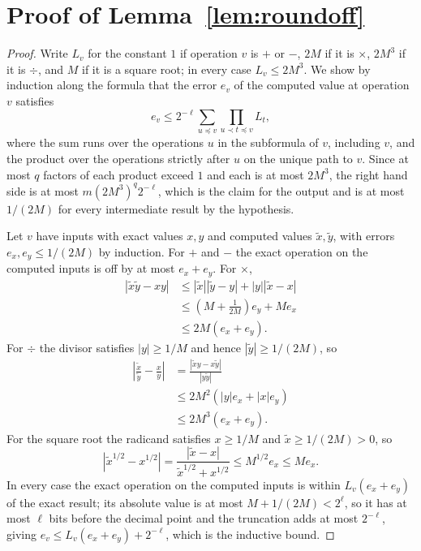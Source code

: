 \documentclass[11pt]{article}
\begin{document}



\appendix
\section{Proof of Lemma~\ref{lem:roundoff}}
\label{app:roundoff}

\begin{proof}
Write $L_v$ for the constant
$1$ if operation
$v$ is
$+$ or
$-$,
$2 M$ if it is
$\times$,
$2 M^{3}$ if it is
$\div$, and
$M$ if it is a square root; in every case
$L_v \le 2 M^{3}$. We show by induction along the formula that the error
$e_v$ of the computed value at operation
$v$ satisfies
\[
e_v
\le
2^{-\ell} \sum_{u \preceq v} \prod_{u \prec t \preceq v} L_t ,
\]
where the sum runs over the operations $u$ in the subformula of
$v$, including
$v$, and the product over the operations strictly after
$u$ on the unique path to
$v$. Since at most
$q$ factors of each product exceed
$1$ and each is at most
$2 M^{3}$, the right hand side is at most
$m ( 2 M^{3} )^{q} 2^{-\ell}$, which is the claim for the output and is
at most
$1 / (2 M)$ for every intermediate result by the hypothesis.

Let $v$ have inputs with exact values
$x, y$ and computed values
$\widetilde x, \widetilde y$, with errors
$e_x, e_y \le 1 / (2 M)$ by induction. For
$+$ and
$-$ the exact operation on the computed inputs is off by at most
$e_x + e_y$. For
$\times$,
\[
\begin{aligned}
\left| \widetilde x \widetilde y - x y \right|
&\le
\left| \widetilde x \right| \left| \widetilde y - y \right|
+ \left| y \right| \left| \widetilde x - x \right|
\\
&\le
\left( M + \frac{1}{2 M} \right) e_y + M e_x
\\
&\le
2 M \left( e_x + e_y \right) .
\end{aligned}
\]
For $\div$ the divisor satisfies
$|y| \ge 1 / M$ and hence
$|\widetilde y| \ge 1 / (2 M)$, so
\[
\begin{aligned}
\left| \frac{\widetilde x}{\widetilde y} - \frac{x}{y} \right|
&=
\frac{ \left| \widetilde x y - x \widetilde y \right| }
     { \left| y \widetilde y \right| }
\\
&\le
2 M^{2} \left( \left| y \right| e_x + \left| x \right| e_y \right)
\\
&\le
2 M^{3} \left( e_x + e_y \right) .
\end{aligned}
\]
For the square root the radicand satisfies
$x \ge 1 / M$ and
$\widetilde x \ge 1 / (2 M) > 0$, so
\[
\left| \widetilde x^{1/2} - x^{1/2} \right|
=
\frac{ \left| \widetilde x - x \right| }
     { \widetilde x^{1/2} + x^{1/2} }
\le
M^{1/2} e_x
\le
M e_x .
\]
In every case the exact operation on the computed inputs is within
$L_v ( e_x + e_y )$ of the exact result; its absolute value is at most
$M + 1 / (2 M) < 2^{\ell}$, so it has at most
$\ell$ bits before the decimal point and the truncation adds at most
$2^{-\ell}$, giving
$e_v \le L_v ( e_x + e_y ) + 2^{-\ell}$, which is the inductive
bound.
\end{proof}
\end{document}
